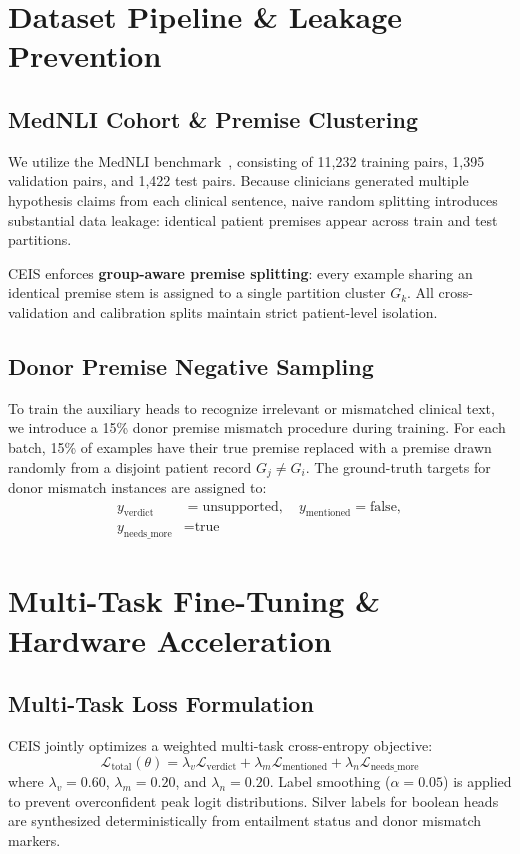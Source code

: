 \documentclass[10pt,conference]{IEEEtran}
\begin{document}
\section{Dataset Pipeline \& Leakage Prevention}
\subsection{MedNLI Cohort \& Premise Clustering}
We utilize the MedNLI benchmark~\cite{romanov2018lessons}, consisting of 11,232 training pairs, 1,395 validation pairs, and 1,422 test pairs. Because clinicians generated multiple hypothesis claims from each clinical sentence, naive random splitting introduces substantial data leakage: identical patient premises appear across train and test partitions. 

CEIS enforces \textbf{group-aware premise splitting}: every example sharing an identical premise stem is assigned to a single partition cluster $G_k$. All cross-validation and calibration splits maintain strict patient-level isolation.

\subsection{Donor Premise Negative Sampling}
To train the auxiliary heads to recognize irrelevant or mismatched clinical text, we introduce a 15\% donor premise mismatch procedure during training. For each batch, 15\% of examples have their true premise replaced with a premise drawn randomly from a disjoint patient record $G_j \neq G_i$. The ground-truth targets for donor mismatch instances are assigned to:
\begin{equation}
\begin{aligned}
y_{\text{verdict}} &= \text{unsupported}, \quad y_{\text{mentioned}} = \text{false}, \\
y_{\text{needs\_more}} &= \text{true}
\end{aligned}
\end{equation}

\section{Multi-Task Fine-Tuning \& Hardware Acceleration}
\subsection{Multi-Task Loss Formulation}
CEIS jointly optimizes a weighted multi-task cross-entropy objective:
\begin{equation}
\mathcal{L}_{\text{total}}(\theta) = \lambda_v \mathcal{L}_{\text{verdict}} + \lambda_m \mathcal{L}_{\text{mentioned}} + \lambda_n \mathcal{L}_{\text{needs\_more}}
\end{equation}
where $\lambda_v = 0.60$, $\lambda_m = 0.20$, and $\lambda_n = 0.20$. Label smoothing ($\alpha = 0.05$) is applied to prevent overconfident peak logit distributions. Silver labels for boolean heads are synthesized deterministically from entailment status and donor mismatch markers.
\end{document}
